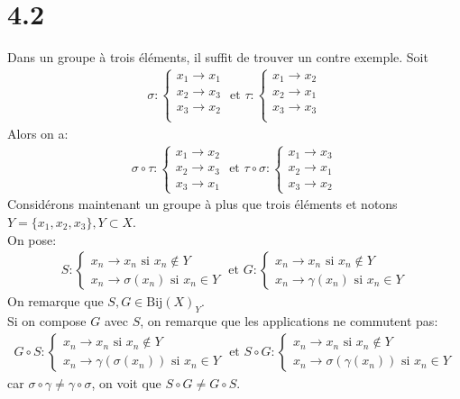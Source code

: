 \documentclass[11pt, a4paper, twoside]{article}
\newcommand{\Bij}{\mathrm{Bij}}
\begin{document}
\section*{4.2}
Dans un groupe à trois éléments, il suffit de trouver un contre exemple.
Soit
\begin{align*}
\sigma: 
\begin{cases}
x_1 \to x_1\\
x_2 \to x_3\\
x_3 \to x_2\\
\end{cases}
\text{ et } 
\tau: 
\begin{cases}
x_1 \to x_2\\
x_2 \to x_1\\
x_3 \to x_3\\
\end{cases}
\end{align*}
Alors on a:
\begin{align*}
\sigma \circ \tau:
\begin{cases}
x_1 \to x_2\\
x_2 \to x_3\\
x_3 \to x_1
\end{cases}
\text{ et } 
\tau \circ \sigma:
\begin{cases}
x_1 \to x_3\\
x_2 \to x_1 \\
x_3 \to x_2
\end{cases}
\end{align*}
Considérons maintenant un groupe à plus que trois éléments et notons $Y=\{x_1,x_2,x_3\}, Y \subset X$.\\
On pose:
\begin{align*}
S:
\begin{cases}
x_n \to x_n \text{ si } x_n \notin Y\\
x_{n} \to \sigma(x_n) \text{ si }  x_n \in Y
\end{cases}
\text{ et }
G:
\begin{cases}
x_n \to x_n \text{ si } x_n \notin Y\\
x_n \to \gamma(x_n) \text{ si } x_n \in Y
\end{cases}
\end{align*}
On remarque que $S, G \in \Bij(X)_Y$.\\
Si on compose $G$ avec $S$, on remarque que les applications ne commutent pas:
\begin{align*}
G \circ S:
\begin{cases}
x_n \to x_n \text{ si } x_n \notin Y\\
x_n \to \gamma(\sigma(x_n)) \text{ si } x_n \in Y
\end{cases}
\text{ et } 
S \circ G:
\begin{cases}
x_n \to x_n \text{ si } x_n \notin Y\\
x_n \to \sigma(\gamma(x_n)) \text{ si } x_n \in Y
\end{cases}
\end{align*}
car $\sigma\circ\gamma \neq \gamma\circ\sigma$, on voit que $S \circ G \neq G \circ S$.
\end{document}
